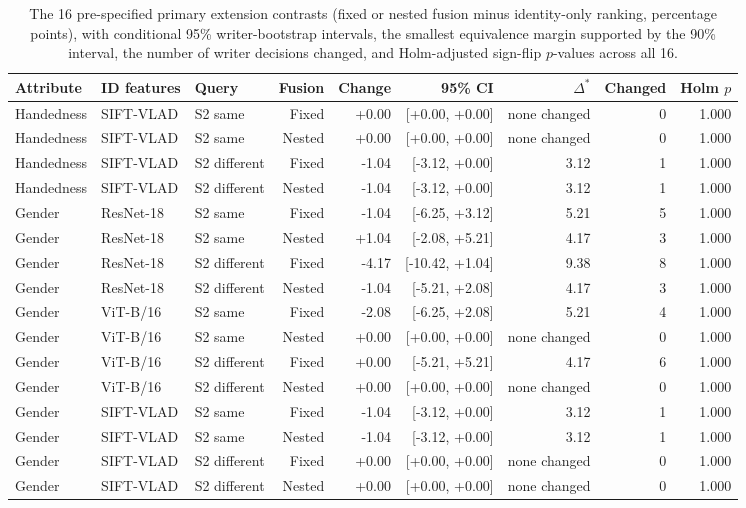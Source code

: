 \begin{table}[ht]
\caption{The 16 pre-specified primary extension contrasts (fixed or nested fusion minus identity-only ranking, percentage points), with conditional 95\% writer-bootstrap intervals, the smallest equivalence margin supported by the 90\% interval, the number of writer decisions changed, and Holm-adjusted sign-flip $p$-values across all 16.}\label{tab:p2tests}
\centering\footnotesize\setlength{\tabcolsep}{3.5pt}
\begin{tabular}{lllrrrrrr}\toprule
Attribute & ID features & Query & Fusion & Change & 95\% CI & $\Delta^*$ & Changed & Holm $p$\\\midrule
Handedness & SIFT-VLAD & S2 same & Fixed & +0.00 & [+0.00, +0.00] & none changed & 0 & 1.000 \\
Handedness & SIFT-VLAD & S2 same & Nested & +0.00 & [+0.00, +0.00] & none changed & 0 & 1.000 \\
Handedness & SIFT-VLAD & S2 different & Fixed & -1.04 & [-3.12, +0.00] & 3.12 & 1 & 1.000 \\
Handedness & SIFT-VLAD & S2 different & Nested & -1.04 & [-3.12, +0.00] & 3.12 & 1 & 1.000 \\
Gender & ResNet-18 & S2 same & Fixed & -1.04 & [-6.25, +3.12] & 5.21 & 5 & 1.000 \\
Gender & ResNet-18 & S2 same & Nested & +1.04 & [-2.08, +5.21] & 4.17 & 3 & 1.000 \\
Gender & ResNet-18 & S2 different & Fixed & -4.17 & [-10.42, +1.04] & 9.38 & 8 & 1.000 \\
Gender & ResNet-18 & S2 different & Nested & -1.04 & [-5.21, +2.08] & 4.17 & 3 & 1.000 \\
Gender & ViT-B/16 & S2 same & Fixed & -2.08 & [-6.25, +2.08] & 5.21 & 4 & 1.000 \\
Gender & ViT-B/16 & S2 same & Nested & +0.00 & [+0.00, +0.00] & none changed & 0 & 1.000 \\
Gender & ViT-B/16 & S2 different & Fixed & +0.00 & [-5.21, +5.21] & 4.17 & 6 & 1.000 \\
Gender & ViT-B/16 & S2 different & Nested & +0.00 & [+0.00, +0.00] & none changed & 0 & 1.000 \\
Gender & SIFT-VLAD & S2 same & Fixed & -1.04 & [-3.12, +0.00] & 3.12 & 1 & 1.000 \\
Gender & SIFT-VLAD & S2 same & Nested & -1.04 & [-3.12, +0.00] & 3.12 & 1 & 1.000 \\
Gender & SIFT-VLAD & S2 different & Fixed & +0.00 & [+0.00, +0.00] & none changed & 0 & 1.000 \\
Gender & SIFT-VLAD & S2 different & Nested & +0.00 & [+0.00, +0.00] & none changed & 0 & 1.000 \\
\bottomrule
\end{tabular}
\end{table}

